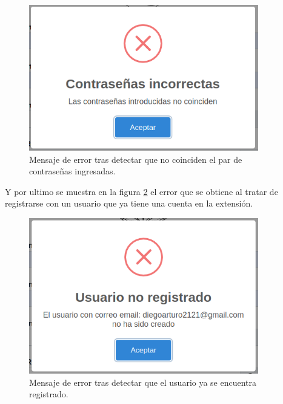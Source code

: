\documentclass[12pt, a4paper, titlepage]{report}
\begin{document}
    			\begin{figure}[H]
    				\begin{center}	\includegraphics[width=10cm]{./imagenes/Disenio/Componente_1/UI_contraseniasNoIguales.PNG}
    					\caption[Mensaje de error]{Mensaje de error tras detectar que no coinciden el par de contraseñas ingresadas.}
    				\label{fig:UI_contraseniasNoIguales}
    				\end{center}
    			\end{figure}
    			
    			Y por ultimo se muestra en la figura \ref{fig:UI_usuarioNoRegistrado} el error que se obtiene al tratar de registrarse con un usuario que ya tiene una cuenta en la extensión.
    			
    			\begin{figure}[H]
    				\begin{center}	\includegraphics[width=10cm]{./imagenes/Disenio/Componente_1/UI_usuarioNoRegistrado.PNG}
    					\caption[Mensaje de error]{Mensaje de error tras detectar que el usuario ya se encuentra registrado.}
    				\label{fig:UI_usuarioNoRegistrado}
    				\end{center}
    			\end{figure}
    			
\end{document}
